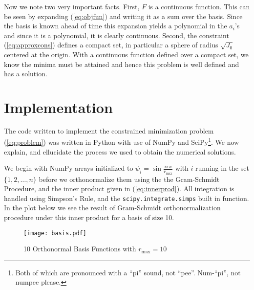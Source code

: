 Now we note two very important facts. First, \(F\) is a continuous function.
This can be seen by expanding (\ref{eq:objfun}) and writing it as a sum over the
basis. Since the basis is known ahead of time this expansion yields a polynomial
in the \(a_i\)'s and since it is a polynomial, it is clearly continuous. Second,
the constraint (\ref{eq:approxcons}) defines a compact set, in particular a
sphere of radius \(\sqrt{J_0}\) centered at the origin. With a continuous
function defined over a compact set, we know the minima must be attained and
hence this problem is well defined and has a solution.


\section{Implementation}\label{sec:imp}
The code written to implement the constrained minimization problem
(\ref{eq:problem}) was written in Python with use of NumPy and
SciPy\footnote{Both of which are pronounced with a ``pi'' sound, not ``pee''.
Num-``pi'', not numpee please.}. We now explain, and ellucidate the process we
used to obtain the numerical solutions.

We begin with NumPy arrays initialized to
\(\psi_i = \sin{\frac{i\pi x}{r_\text{max}}}\) with \(i\) running in the set
\(\{1,2,\ldots, n\}\) before we orthonormalize them using the  the Gram-Schmidt
Procedure, and the inner product given in (\ref{eq:innerprod}). All integration
is handled using Simpson's Rule, and the \texttt{scipy.integrate.simps} built in
function. In the plot below we see the result of Gram-Schmidt orthonormalization
procedure under this inner product for a basis of size 10.
\begin{figure}[H]
    \centering
    \texttt{[image: basis.pdf]}
    \caption{10 Orthonormal Basis Functions with \(r_\text{max} = 10\)}\label{fig:basis}
\end{figure}

